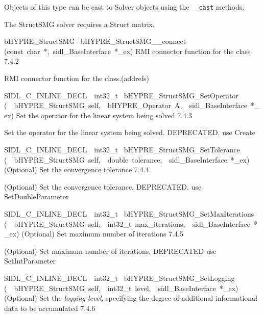 \documentclass{article}
\begin{document}
\begin{cxxentry}
\begin{cxxentry}
\begin{cxxvariable}
\begin{cxxdoc}
Objects of this type can be cast to Solver objects
using the {\tt \_\_cast} methods.

The StructSMG solver requires a Struct matrix.
\end{cxxdoc}
\end{cxxvariable}
\begin{cxxfunction}
{bHYPRE\_StructSMG\ }
        {bHYPRE\_StructSMG\_\_connect}
        {(const\ char\ *,\ sidl\_BaseInterface\ *\_ex)}
        {
RMI connector function for the class}
        {7.4.2}
\begin{cxxdoc}

RMI connector function for the class.(addrefs)
\end{cxxdoc}
\end{cxxfunction}
\begin{cxxfunction}
{SIDL\_C\_INLINE\_DECL\ \ int32\_t\ }
        {bHYPRE\_StructSMG\_SetOperator}
        {(\ \ bHYPRE\_StructSMG\ self,\ \ bHYPRE\_Operator\ A,\ \ sidl\_BaseInterface\ *\_ex)}
        {
Set the operator for the linear system being solved}
        {7.4.3}
\begin{cxxdoc}

Set the operator for the linear system being solved.
DEPRECATED.  use Create
\end{cxxdoc}
\end{cxxfunction}
\begin{cxxfunction}
{SIDL\_C\_INLINE\_DECL\ \ int32\_t\ }
        {bHYPRE\_StructSMG\_SetTolerance}
        {(\ \ bHYPRE\_StructSMG\ self,\ \ double\ tolerance,\ \ sidl\_BaseInterface\ *\_ex)}
        {
(Optional) Set the convergence tolerance}
        {7.4.4}
\begin{cxxdoc}

(Optional) Set the convergence tolerance.
DEPRECATED.  use SetDoubleParameter
\end{cxxdoc}
\end{cxxfunction}
\begin{cxxfunction}
{SIDL\_C\_INLINE\_DECL\ \ int32\_t\ }
        {bHYPRE\_StructSMG\_SetMaxIterations}
        {(\ \ bHYPRE\_StructSMG\ self,\ \ int32\_t\ max\_iterations,\ \ sidl\_BaseInterface\ *\_ex)}
        {
(Optional) Set maximum number of iterations}
        {7.4.5}
\begin{cxxdoc}

(Optional) Set maximum number of iterations.
DEPRECATED   use SetIntParameter
\end{cxxdoc}
\end{cxxfunction}
\begin{cxxfunction}
{SIDL\_C\_INLINE\_DECL\ \ int32\_t\ }
        {bHYPRE\_StructSMG\_SetLogging}
        {(\ \ bHYPRE\_StructSMG\ self,\ \ int32\_t\ level,\ \ sidl\_BaseInterface\ *\_ex)}
        {
(Optional) Set the {\it logging level}, specifying the degree
of additional informational data to be accumulated}
        {7.4.6}
\begin{cxxdoc}


\end{cxxdoc}
\end{cxxfunction}
\end{cxxentry}
\end{cxxentry}
\end{document}
